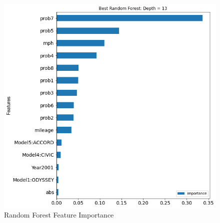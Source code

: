 \documentclass[12pt]{article}
\begin{document}
\begin{figure}[H]
	\begin{center}
	\includegraphics[width=\textwidth, keepaspectratio, angle=0]{RF_FeatureImp.png}
	\caption{Random Forest Feature Importance}
	\label{fig:RF_FeatureImp}
	\end{center}
\end{figure}

\pagebreak
\end{document}
